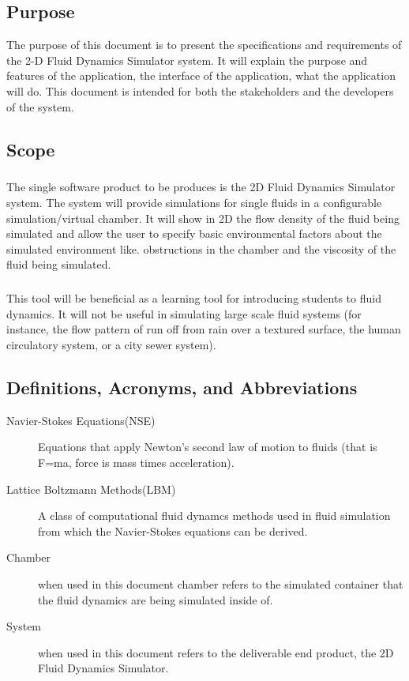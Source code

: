 \documentclass{scrartcl}
\begin{document}
\subsection{Purpose}
The purpose of this document is to present the specifications and requirements of the  2-D Fluid Dynamics Simulator system. It will explain the purpose and features of the application, the interface of the application, what the application will do. This document is intended for both the stakeholders and the developers of the system.

\subsection{Scope}
\subparagraph{}
The single software product to be produces is the 2D Fluid Dynamics Simulator system. The system will provide simulations for single fluids in a configurable simulation/virtual chamber. It will show in 2D the flow density of the fluid being simulated and allow the user to specify basic environmental factors about the simulated environment like. obstructions in the chamber and the viscosity of the fluid being simulated. 
\subparagraph{}
This tool will be beneficial as a learning tool for introducing students to fluid dynamics. It will not be useful in simulating large scale fluid systems (for instance, the flow pattern of run off from rain over a textured surface, the human circulatory system, or a city sewer system).

\subsection{Definitions, Acronyms, and Abbreviations}
\begin{description}
	\item[Navier-Stokes Equations(NSE)] Equations that apply Newton's second law of motion to fluids (that is F=ma, force is mass times acceleration).
	
	\item[Lattice Boltzmann Methods(LBM)] A class of computational fluid dynamcs methods used in fluid simulation from which the Navier-Stokes equations can be derived.
	
	\item[Chamber] when used in this document chamber refers to the simulated container that the fluid dynamics are being simulated inside of.
	
	\item[System] when used in this document refers to the deliverable end product, the 2D Fluid Dynamics Simulator.
\end{description}
\end{document}
